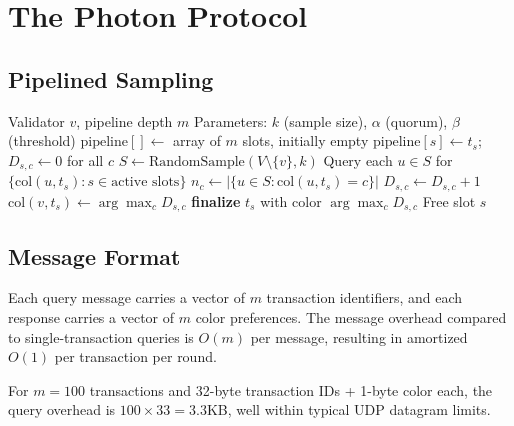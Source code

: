 \section{The Photon Protocol}

\label{sec:protocol}

\subsection{Pipelined Sampling}

\begin{algorithm}[H]
\caption{Photon Protocol --- Pipelined Consensus}
\label{alg:photon-core}
\begin{algorithmic}[1]
\Require Validator $v$, pipeline depth $m$
\Require Parameters: $k$ (sample size), $\alpha$ (quorum), $\beta$ (threshold)
\State $\text{pipeline}[] \gets$ array of $m$ slots, initially empty
\Loop
    \State {}
            \State $\text{pipeline}[s] \gets t_s$; $D_{s,c} \gets 0$ for all $c$
        \EndIf
    \EndFor
    \State $S \gets \text{RandomSample}(V \setminus \{v\}, k)$
    \State {}
    \State Query each $u \in S$ for $\{\text{col}(u, t_s) : s \in \text{active slots}\}$
            \State $n_c \gets |\{u \in S : \text{col}(u, t_s) = c\}|$
                \State $D_{s,c} \gets D_{s,c} + 1$
            \EndIf
        \EndFor
        \State $\text{col}(v, t_s) \gets \arg\max_c D_{s,c}$
            \State \textbf{finalize} $t_s$ with color $\arg\max_c D_{s,c}$
            \State Free slot $s$
        \EndIf
    \EndFor
\EndLoop
\end{algorithmic}
\end{algorithm}

\subsection{Message Format}

Each query message carries a vector of $m$ transaction identifiers, and each response
carries a vector of $m$ color preferences. The message overhead compared to single-transaction
queries is $O(m)$ per message, resulting in amortized $O(1)$ per transaction per round.

For $m = 100$ transactions and 32-byte transaction IDs + 1-byte color each, the query
overhead is $100 \times 33 = 3.3$KB, well within typical UDP datagram limits.

